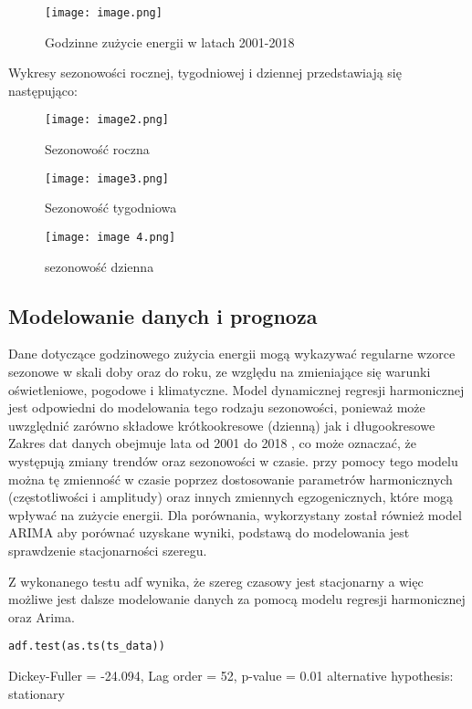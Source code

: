 \documentclass{article}
\begin{document}
\begin{figure}
    \texttt{[image: image.png]}
    \caption{Godzinne zużycie energii w latach 2001-2018}
    \label{}
\end{figure}

\newpage

Wykresy sezonowości rocznej, tygodniowej i dziennej przedstawiają się następująco:

\begin{figure}[h]
    \texttt{[image: image2.png]}
    \caption{Sezonowość roczna}
    \label{fig:seasonality-yearly}
\end{figure}

\begin{figure}[h]
    \texttt{[image: image3.png]}
    \caption{Sezonowość tygodniowa}
    \label{fig:seasonality-weekly}
\end{figure}

\begin{figure}[h]
    \texttt{[image: image 4.png]}
    \caption{sezonowość dzienna}
    \label{fig:enter-label}
\end{figure}

\newpage
\subsection{Modelowanie danych i prognoza}
  Dane dotyczące godzinowego zużycia energii mogą wykazywać regularne wzorce sezonowe w skali doby oraz do roku, ze względu na zmieniające się warunki oświetleniowe, pogodowe i klimatyczne. Model dynamicznej regresji harmonicznej jest odpowiedni do modelowania tego rodzaju sezonowości, ponieważ może uwzględnić zarówno składowe krótkookresowe (dzienną) jak i długookresowe Zakres dat danych obejmuje lata od 2001 do 2018 , co może oznaczać, że występują zmiany trendów oraz sezonowości w czasie. przy pomocy tego modelu można tę zmienność w czasie poprzez dostosowanie parametrów harmonicznych (częstotliwości i amplitudy) oraz innych zmiennych egzogenicznych, które mogą wpływać na zużycie energii.
    Dla porównania, wykorzystany został również model ARIMA aby porównać uzyskane wyniki, podstawą do modelowania jest sprawdzenie stacjonarności szeregu.

    
Z wykonanego testu adf wynika, że szereg czasowy jest stacjonarny a więc możliwe jest dalsze modelowanie danych za pomocą modelu regresji harmonicznej oraz Arima.
\begin{lstlisting}[caption={Test ADF }]
adf.test(as.ts(ts_data))
\end{lstlisting}
Dickey-Fuller = -24.094, Lag order = 52, p-value = 0.01
alternative hypothesis: stationary
\end{document}
